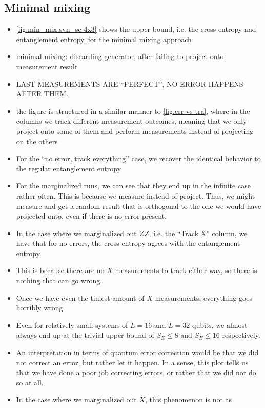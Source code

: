 \subsection{Minimal mixing}
\begin{itemize}
  \item \cref{fig:min_mix-svn_se-4x3} shows the upper bound, i.e. the cross
    entropy and entanglement entropy, for the minimal mixing approach
  \item minimal mixing: discarding generator, after failing to project onto
    measurement result
  \item LAST MEASUREMENTS ARE \enquote{PERFECT}, NO ERROR HAPPENS AFTER THEM.
  \item the figure is structured in a similar manner to \cref{fig:err-vs-tra},
    where in the columns we track different measurement outcomes, meaning that
    we only project onto some of them and perform measurements instead of
    projecting on the others
  \item For the \enquote{no error, track everything} case, we recover the
    identical behavior to the regular entanglement entropy
  \item For the marginalized runs, we can see that they end up in the infinite
    case rather often. This is because we measure instead of project. Thus, we
    might measure and get a random result that is orthogonal to the one we
    would have projected onto, even if there is no error present.
  \item In the case where we marginalized out $ZZ$, i.e. the \enquote{Track X}
    column, we have that for no errors, the cross entropy agrees with the
    entanglement entropy.
  \item This is because there are no $X$ measurements to track either way, so
    there is nothing that can go wrong.
  \item Once we have even the tiniest amount of $X$ measurements, everything
    goes horribly wrong
  \item Even for relatively small systems of $L=16$ and $L=32$ qubits, we
    almost always end up at the trivial upper bound of $S_E \leq 8$ and $S_E
    \leq 16$ respectively. 
  \item An interpretation in terms of quantum error correction would be that we
    did not correct an error, but rather let it happen. In a sense, this plot
    tells us that we have done a poor job correcting errors, or rather that we
    did not do so at all.
  \item In the case where we marginalized out $X$, this phenomenon is not as

\end{itemize}
